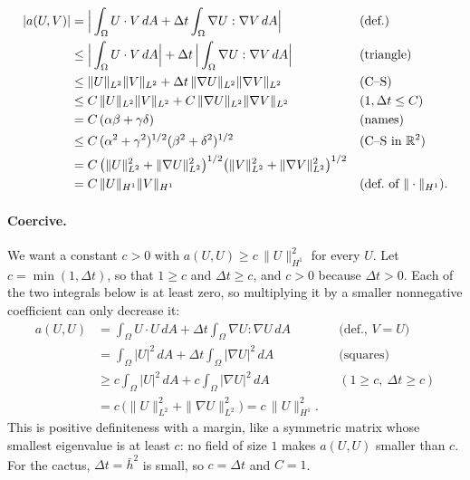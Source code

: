 \begin{align*}
|a(U, V)| &= \Big| \int_\Omega U\cdot V\, dA + \Delta t \int_\Omega \nabla U : \nabla V\, dA \Big| && \text{(def.)} \\
&\leq \Big| \int_\Omega U\cdot V\, dA \Big| + \Delta t\, \Big| \int_\Omega \nabla U : \nabla V\, dA \Big| && \text{(triangle)} \\
&\leq \|U\|_{L^2}\|V\|_{L^2} + \Delta t\, \|\nabla U\|_{L^2}\|\nabla V\|_{L^2} && \text{(C--S)} \\
&\leq C\, \|U\|_{L^2}\|V\|_{L^2} + C\, \|\nabla U\|_{L^2}\|\nabla V\|_{L^2} && (1, \Delta t \le C) \\
&= C\, (\alpha\beta + \gamma\delta) && \text{(names)} \\
&\leq C\, (\alpha^2 + \gamma^2)^{1/2} (\beta^2 + \delta^2)^{1/2} && \text{(C--S in } \mathbb{R}^2\text{)} \\
&= C\, \big(\|U\|_{L^2}^2 + \|\nabla U\|_{L^2}^2\big)^{1/2} \big(\|V\|_{L^2}^2 + \|\nabla V\|_{L^2}^2\big)^{1/2} \\
&= C\, \|U\|_{H^1}\|V\|_{H^1} && \text{(def.\ of } \|\cdot\|_{H^1}\text{)}.
\end{align*}

\paragraph{Coercive.} We want a constant $c > 0$ with $a(U, U) \geq c\, \|U\|_{H^1}^2$ for every $U$. Let $c = \min(1, \Delta t)$, so that $1 \ge c$ and $\Delta t \ge c$, and $c > 0$ because $\Delta t > 0$. Each of the two integrals below is at least zero, so multiplying it by a smaller nonnegative coefficient can only decrease it:
\begin{align*}
a(U, U) &= \int_\Omega U\cdot U\, dA + \Delta t \int_\Omega \nabla U : \nabla U\, dA && \text{(def., } V = U\text{)} \\
&= \int_\Omega |U|^2\, dA + \Delta t \int_\Omega |\nabla U|^2\, dA && \text{(squares)} \\
&\geq c \int_\Omega |U|^2\, dA + c \int_\Omega |\nabla U|^2\, dA && (1 \ge c,\ \Delta t \ge c) \\
&= c\, \big( \|U\|_{L^2}^2 + \|\nabla U\|_{L^2}^2 \big) = c\, \|U\|_{H^1}^2 .
\end{align*}
This is positive definiteness with a margin, like a symmetric matrix whose smallest eigenvalue is at least $c$: no field of size $1$ makes $a(U, U)$ smaller than $c$. For the cactus, $\Delta t = \bar h^2$ is small, so $c = \Delta t$ and $C = 1$.

